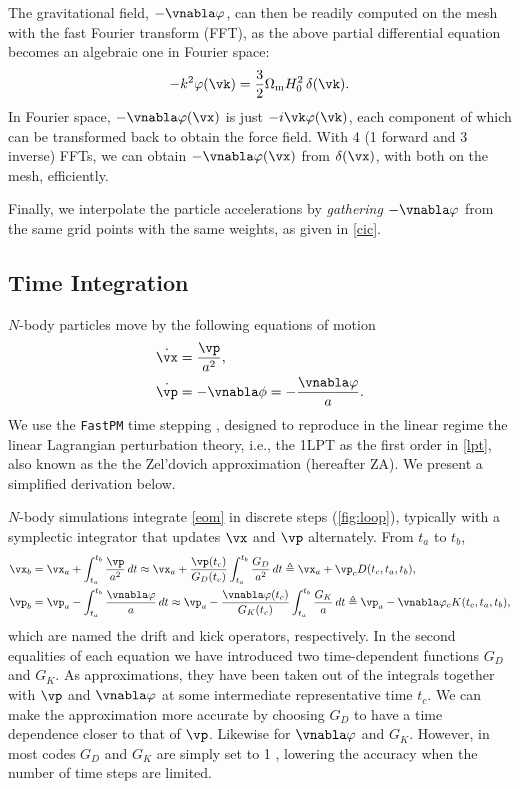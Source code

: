 \documentclass[modern, dvipsnames]{aastex631}
\renewcommand{\d}{d}
\newcommand{\Omegam}{\Omega_\mathrm{m}}
\begin{document}
The gravitational field, $- \vnabla \varphi$, can then be readily
computed on the mesh with the fast Fourier transform (FFT), as the above
partial differential equation becomes an algebraic one in Fourier space:
%
\begin{equation}
- k^2 \varphi(\vk) = \frac32 \Omegam H_0^2 \, \delta(\vk).
\end{equation}
%
In Fourier space, $- \vnabla \varphi(\vx)$ is just $- i \vk
\varphi(\vk)$, each component of which can be transformed back to obtain
the force field.
With 4 (1 forward and 3 inverse) FFTs, we can obtain $- \vnabla
\varphi(\vx)$ from $\delta(\vx)$, with both on the mesh, efficiently.

Finally, we interpolate the particle accelerations by \emph{gathering}
$- \vnabla \varphi$ from the same grid points with the same weights, as
given in \eqref{cic}.


\vspace{1em}
\subsection{Time Integration}
\label{sec:integ}

$N$-body particles move by the following equations of motion
%
\begin{align}
\dot\vx &= \frac{\vp}{a^2}, \nonumber\\
\dot\vp &= -\vnabla\phi = - \frac{\vnabla\varphi}a.
\label{eom}
\end{align}
%
We use the \texttt{FastPM} time stepping \citep{FastPM}, designed to
reproduce in the linear regime the linear Lagrangian perturbation
theory, i.e., the 1LPT as the first order in \eqref{lpt}, also known as
the the Zel'dovich approximation (hereafter ZA).
We present a simplified derivation below.

$N$-body simulations integrate \eqref{eom} in discrete steps
(\autoref{fig:loop}), typically with a symplectic integrator that
updates $\vx$ and $\vp$ alternately.
From $t_a$ to $t_b$,
%
\begin{align}
\vx_b
  &= \vx_a + \int_{t_a}^{t_b} \frac{\vp}{a^2} \,\d t
  \approx \vx_a + \frac{\vp(t_c)}{G_D(t_c)}
    \int_{t_a}^{t_b} \frac{G_D}{a^2} \,\d t
  \triangleq \vx_a + \vp_c D(t_c, t_a, t_b), \nonumber\\
%
\vp_b
  &= \vp_a - \int_{t_a}^{t_b} \frac{\vnabla\varphi}a \,\d t
  \approx \vp_a - \frac{\vnabla\varphi(t_c)}{G_K(t_c)}
    \int_{t_a}^{t_b} \frac{G_K}a \,\d t
  \triangleq \vp_a - \vnabla\varphi_c K(t_c, t_a, t_b),
\label{eom_integ}
\end{align}
%
which are named the drift and kick operators, respectively.
In the second equalities of each equation we have introduced two
time-dependent functions $G_D$ and $G_K$.
As approximations, they have been taken out of the integrals together
with $\vp$ and $\vnabla\varphi$ at some intermediate representative time
$t_c$.
We can make the approximation more accurate by choosing $G_D$ to have a
time dependence closer to that of $\vp$.
Likewise for $\vnabla\varphi$ and $G_K$.
However, in most codes $G_D$ and $G_K$ are simply set to 1
\citep{QuinnEtAl1997}, lowering the accuracy when the number of time
steps are limited.
\end{document}

